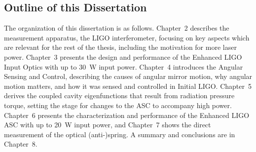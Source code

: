\subsection{Outline of this Dissertation}
The organization of this dissertation is as follows. Chapter~2
describes the measurement apparatus, the LIGO interferometer, focusing
on key aspects which are relevant for the rest of the thesis,
including the motivation for more laser power. Chapter~3 presents the
design and performance of the Enhanced LIGO Input Optics with up to
30~W input power. Chapter~4 introduces the Angular Sensing and
Control, describing the causes of angular mirror motion, why angular
motion matters, and how it was sensed and controlled in Initial
LIGO. Chapter~5 derives the coupled cavity eigenfunctions that result
from radiation pressure torque, setting the stage for changes to the
ASC to accompany high power. Chapter~6 presents the characterization
and performance of the Enhanced LIGO ASC with up to 20~W input power,
and Chapter~7 shows the direct measurement of the optical
(anti-)spring. A summary and conclusions are in Chapter~8.

